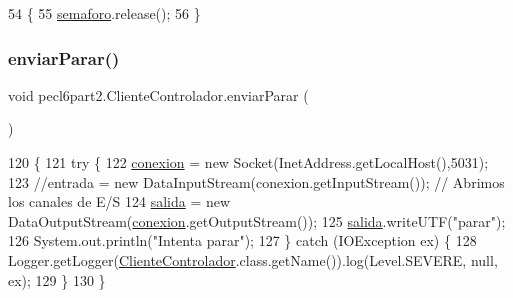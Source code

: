 \begin{DoxyCode}
54         \{
55             \mbox{\hyperlink{classpecl6part2_1_1_cliente_controlador_a200ce4defcaa86a68e9c8234f9e48a81}{semaforo}}.release();
56         \}
\end{DoxyCode}
\mbox{\label{classpecl6part2_1_1_cliente_controlador_ab228718d193754ecf65492b86d5be0d4}} 
\subsubsection{\texorpdfstring{enviar\+Parar()}{enviarParar()}}
{\footnotesize\ttfamily void pecl6part2.\+Cliente\+Controlador.\+enviar\+Parar (\begin{DoxyParamCaption}{ }\end{DoxyParamCaption})\hspace{0.3cm}{\ttfamily [inline]}}


\begin{DoxyCode}
120         \{
121             \textcolor{keywordflow}{try} \{
122                 \mbox{\hyperlink{classpecl6part2_1_1_cliente_controlador_a4882463501ccc3555c15225ea3076745}{conexion}} = \textcolor{keyword}{new} Socket(InetAddress.getLocalHost(),5031);
123                 \textcolor{comment}{//entrada = new DataInputStream(conexion.getInputStream());  // Abrimos los canales de E/S}
124                 \mbox{\hyperlink{classpecl6part2_1_1_cliente_controlador_a05461ea286f84b5f3f8b82641a5d23af}{salida}}  = \textcolor{keyword}{new} DataOutputStream(\mbox{\hyperlink{classpecl6part2_1_1_cliente_controlador_a4882463501ccc3555c15225ea3076745}{conexion}}.getOutputStream());
125                 \mbox{\hyperlink{classpecl6part2_1_1_cliente_controlador_a05461ea286f84b5f3f8b82641a5d23af}{salida}}.writeUTF(\textcolor{stringliteral}{"parar"});
126                 System.out.println(\textcolor{stringliteral}{"Intenta parar"});
127             \} \textcolor{keywordflow}{catch} (IOException ex) \{
128                 Logger.getLogger(\mbox{\hyperlink{classpecl6part2_1_1_cliente_controlador_a6e526681bd2137858bfb2940eeb23cc8}{ClienteControlador}}.class.getName()).log(Level.SEVERE, 
      null, ex);
129             \}
130         \}
\end{DoxyCode}
\mbox{\label{classpecl6part2_1_1_cliente_controlador_af4b9fc77a65fa32d6d9fd5ae39da2b30}} 
